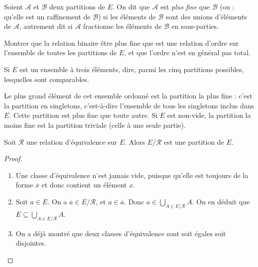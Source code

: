 \begin{definition}
Soient $\mathcal A$ et $\mathcal B$ deux partitions de $E$. On dit que $\mathcal A$ est \emph{plus fine} que $\mathcal B$ (ou : qu'elle est un raffinement de $\mathcal B$) si les éléments de $\mathcal B$ sont des unions d'éléments de $\mathcal A$, autrement dit si $\mathcal A$ fractionne les éléments de $\mathcal B$ en sous-parties.
\end{definition}


\begin{exercice}
Montrer que la relation binaire \og être plus fine que\fg{} est une relation d'ordre sur l'ensemble de toutes les partitions de $E$, et que l'ordre n'est en général pas total.

Si $E$ est un ensemble à trois éléments, dire, parmi les cinq partitions possibles, lesquelles sont comparables.
\end{exercice}


\begin{remarque}
Le plus grand élément de cet ensemble ordonné est la partition la  plus fine : c'est la partition en singletons, c'est-à-dire l'ensemble de tous les singletons inclus dans $E$. Cette partition est plus fine que toute autre. Si $E$ est non-vide, la partition la moins fine est la partition triviale (celle à une seule partie).  
\end{remarque}



\begin{proposition}\label{prop-classes-partition}
Soit $\mathcal R$ une relation d'équivalence sur $E$. Alors $E/\mathcal R$ est une partition de $E$.
\end{proposition}
\begin{proof}
\begin{enumerate}
\item Une classe d'équivalence n'est jamais vide, puisque qu'elle est toujours de la forme $\overline{x}$ et donc contient un élément $x$.
\item Soit $a\in E$. On a $\overline{a} \in E/\mathcal R$, et $a\in \overline{a}$. Donc $a\in \bigcup_{A\in E/\mathcal R} A$. On en déduit que $E\subseteq \bigcup_{A\in E/\mathcal R} A$.
\item On a déjà montré que deux classes d'équivalence sont soit égales soit disjointes.
\end{enumerate}
\end{proof}

